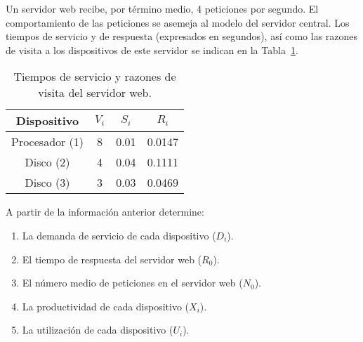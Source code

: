 \begin{ejercicio}\label{ej:5.8}
    Un servidor web recibe, por término medio, 4 peticiones por segundo. El comportamiento de las peticiones se asemeja al modelo del servidor central. Los tiempos de servicio y de respuesta (expresados en segundos), así como las razones de visita a los dispositivos de este servidor se indican en la Tabla~\ref{tab:5.8}.
    \begin{table}[h]
        \centering
        \begin{tabular}{|c|c|c|c|}
            \hline
            Dispositivo & $V_i$ & $S_i$ & $R_i$ \\
            \hline
            Procesador (1) & 8 & 0.01 & 0.0147 \\
            Disco (2) & 4 & 0.04 & 0.1111 \\
            Disco (3) & 3 & 0.03 & 0.0469 \\
            \hline
        \end{tabular}
        \caption{Tiempos de servicio y razones de visita del servidor web.}
        \label{tab:5.8}
    \end{table}
    A partir de la información anterior determine:
    \begin{enumerate}
        \item La demanda de servicio de cada dispositivo ($D_i$).
        \item El tiempo de respuesta del servidor web ($R_0$).
        \item El número medio de peticiones en el servidor web ($N_0$).
        \item La productividad de cada dispositivo ($X_i$).
        \item La utilización de cada dispositivo ($U_i$).
    \end{enumerate}
\end{ejercicio}
\begin{comment}
\solucion
    \begin{enumerate}
        \item $D_1 = 0.08$, $D_2 = 0.16$, $D_3 = 0.09$ (expresados en segundos o, más concretamente, segundos/petición).
        \item $R_0 = 0.7027$ segundos.
        \item $N_0 = 2.8108$ peticiones.
        \item $X_1 = 32$, $X_2 = 16$, $X_3 = 12$ (expresados en peticiones/s).
        \item $U_1 = 0.32$, $U_2 = 0.64$, $U_3 = 0.36$.
    \end{enumerate}
\end{comment}

